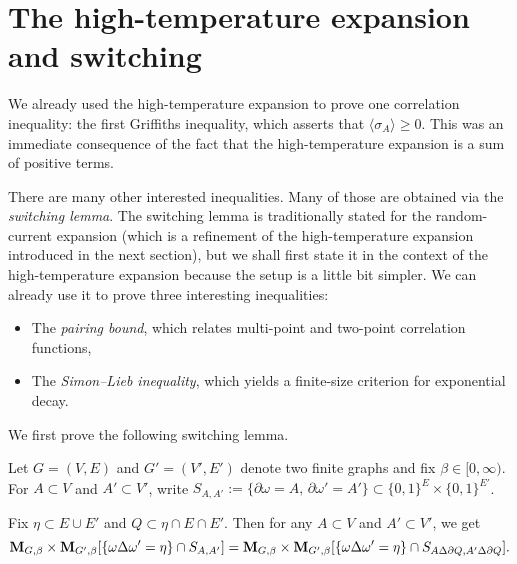 \section{The high-temperature expansion and switching}

We already used the high-temperature expansion to prove one correlation inequality:
the first Griffiths inequality, which asserts that $\langle\sigma_A\rangle\geq 0$.
This was an immediate consequence of the fact that the high-temperature expansion is a sum of positive terms.

There are many other interested inequalities.
Many of those are obtained via the \emph{switching lemma}.
The switching lemma is traditionally stated for the random-current expansion
(which is a refinement of the high-temperature expansion introduced in the next section),
but we shall first state it in the context of the high-temperature expansion
because the setup is a little bit simpler.
We can already use it to prove three interesting inequalities:
\begin{itemize}
    \item The \emph{pairing bound}, which relates multi-point and two-point correlation functions,
    \item The \emph{Simon--Lieb inequality}, which yields a finite-size criterion for exponential decay.
\end{itemize}

We first prove the following switching lemma.

\begin{lemma}
    Let $G=(V,E)$ and $G'=(V',E')$ denote two finite graphs and fix $\beta\in[0,\infty)$.
    For $A\subset V$ and $A'\subset V'$,
    write $S_{A,A'}:=\{\partial\omega=A,\,\partial\omega'=A'\}\subset \{0,1\}^E\times\{0,1\}^{E'}$.

    Fix $\eta\subset E\cup E'$
    and $Q\subset \eta\cap E\cap E'$.
    Then for any $A\subset V$ and $A'\subset V'$,
    we get
    \begin{equation}
        \mathbf{M}_{G,\beta}\times\mathbf{M}_{G',\beta}
        [\{\omega\Delta\omega'=\eta\}\cap S_{A,A'}]
        =
        \mathbf{M}_{G,\beta}\times\mathbf{M}_{G',\beta}
        [\{\omega\Delta\omega'=\eta\}\cap S_{A\Delta\partial Q,A'\Delta\partial Q}].
    \end{equation}
\end{lemma}

